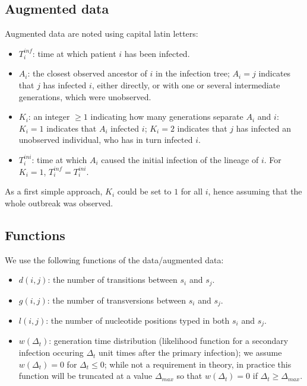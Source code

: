 \documentclass[10pt]{article}
\begin{document}
\subsection*{Augmented data}
Augmented data are noted using capital latin letters:
\begin{itemize}
	\item $T_i^{inf}$: time at which patient $i$ has been infected.
        \item $A_i$: the closest observed ancestor of $i$ in the infection tree; $A_i=j$ indicates that $j$ has infected $i$, either directly, or with one or several intermediate generations, which were unobserved.
	\item $K_i$: an integer $\geq 1$ indicating how many generations separate $A_i$ and $i$: $K_i=1$ indicates that $A_i$ infected $i$; $K_i=2$ indicates that $j$ has infected an unobserved individual, who has in turn infected $i$.
	\item $T_i^{ini}$: time at which $A_i$ caused the initial infection of the lineage of $i$. For $K_i=1$, $T_i^{inf} = T_i^{ini}$.
\end{itemize}

As a first simple approach, $K_i$ could be set to $1$ for all $i$, hence assuming that the whole outbreak was observed.



\subsection*{Functions}
We use the following functions of the data/augmented data:
\begin{itemize}
	\item $d(i,j)$: the number of transitions between $s_i$ and $s_j$.
 	\item $g(i,j)$: the number of transversions between $s_i$ and $s_j$.
 	\item $l(i,j)$: the number of nucleotide positions typed in both $s_i$ and $s_j$.
 	\item $w(\Delta_t)$: generation time distribution (likelihood function for a secondary infection occuring $\Delta_t$ unit times after the primary infection); we assume $w(\Delta_t)=0$ for $\Delta_t \leq 0$; while not a requirement in theory, in practice this function will be truncated at a value $\Delta_{max}$ so that $w(\Delta_t)=0$ if $\Delta_t \geq \Delta_{max}$.
\end{itemize}
\end{document}
